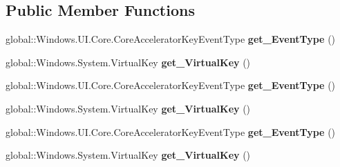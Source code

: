 \subsection*{Public Member Functions}
\begin{DoxyCompactItemize}
\item 
\mbox{\label{interface_windows_1_1_u_i_1_1_core_1_1_i_accelerator_key_event_args_a36825eed5be3040532c09697b74e7e2f}} 
global\+::\+Windows.\+U\+I.\+Core.\+Core\+Accelerator\+Key\+Event\+Type {\bfseries get\+\_\+\+Event\+Type} ()
\item 
\mbox{\label{interface_windows_1_1_u_i_1_1_core_1_1_i_accelerator_key_event_args_a11db28446dfab78bff980c1ef18b85f6}} 
global\+::\+Windows.\+System.\+Virtual\+Key {\bfseries get\+\_\+\+Virtual\+Key} ()
\item 
\mbox{\label{interface_windows_1_1_u_i_1_1_core_1_1_i_accelerator_key_event_args_a36825eed5be3040532c09697b74e7e2f}} 
global\+::\+Windows.\+U\+I.\+Core.\+Core\+Accelerator\+Key\+Event\+Type {\bfseries get\+\_\+\+Event\+Type} ()
\item 
\mbox{\label{interface_windows_1_1_u_i_1_1_core_1_1_i_accelerator_key_event_args_a11db28446dfab78bff980c1ef18b85f6}} 
global\+::\+Windows.\+System.\+Virtual\+Key {\bfseries get\+\_\+\+Virtual\+Key} ()
\item 
\mbox{\label{interface_windows_1_1_u_i_1_1_core_1_1_i_accelerator_key_event_args_a36825eed5be3040532c09697b74e7e2f}} 
global\+::\+Windows.\+U\+I.\+Core.\+Core\+Accelerator\+Key\+Event\+Type {\bfseries get\+\_\+\+Event\+Type} ()
\item 
\mbox{\label{interface_windows_1_1_u_i_1_1_core_1_1_i_accelerator_key_event_args_a11db28446dfab78bff980c1ef18b85f6}} 
global\+::\+Windows.\+System.\+Virtual\+Key {\bfseries get\+\_\+\+Virtual\+Key} ()
\item 
\mbox{\label{interface_windows_1_1_u_i_1_1_core_1_1_i_accelerator_key_event_args_a36825eed5be3040532c09697b74e7e2f}} 

\end{DoxyCompactItemize}
